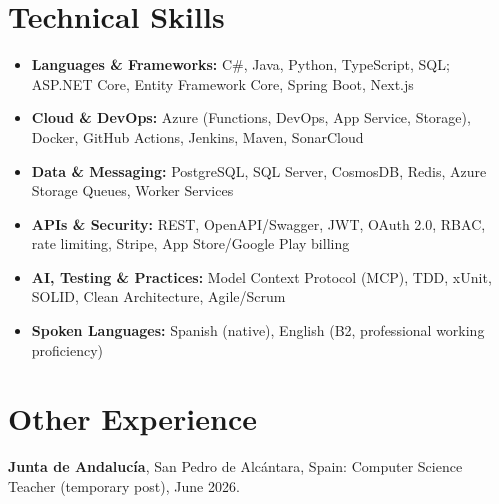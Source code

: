 \documentclass[a4paper,10pt]{article}
\begin{document}
\section{Technical Skills}
\vspace{2pt}
\small
\begin{itemize}[leftmargin=0pt, label={}, topsep=0pt, itemsep=1pt, parsep=0pt]
  \item \textbf{Languages \& Frameworks:} C\#, Java, Python, TypeScript, SQL; ASP.NET Core, Entity Framework Core, Spring Boot, Next.js
  \item \textbf{Cloud \& DevOps:} Azure (Functions, DevOps, App Service, Storage), Docker, GitHub Actions, Jenkins, Maven, SonarCloud
  \item \textbf{Data \& Messaging:} PostgreSQL, SQL Server, CosmosDB, Redis, Azure Storage Queues, Worker Services
  \item \textbf{APIs \& Security:} REST, OpenAPI/Swagger, JWT, OAuth 2.0, RBAC, rate limiting, Stripe, App Store/Google Play billing
  \item \textbf{AI, Testing \& Practices:} Model Context Protocol (MCP), TDD, xUnit, SOLID, Clean Architecture, Agile/Scrum
  \item \textbf{Spoken Languages:} Spanish (native), English (B2, professional working proficiency)
\end{itemize}

\vspace{-4pt}

\section{Other Experience}
\small
\textbf{Junta de Andalucía}, San Pedro de Alcántara, Spain: Computer Science Teacher (temporary post), June 2026.
\end{document}
